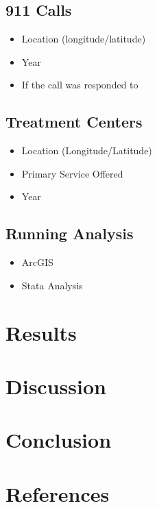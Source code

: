 \documentclass[12pt]{article}
\begin{document}
\subsection{911 Calls}
\begin{itemize}
    \item Location (longitude/latitude)
    \item Year
    \item If the call was responded to
\end{itemize}

\subsection{Treatment Centers}
\begin{itemize}
    \item Location (Longitude/Latitude)
    \item Primary Service Offered
    \item Year
\end{itemize}

\subsection{Running Analysis}
\label{Data Manipulation and Analysis}
\begin{itemize}
    \item ArcGIS
    \item Stata Analysis
\end{itemize}

\section{Results}

\section{Discussion}

\section{Conclusion}

\section{References}
\end{document}
